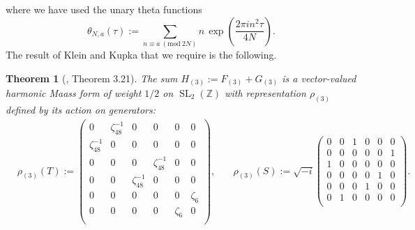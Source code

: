 \documentclass[11pt,reqno]{amsart}
\newtheorem{theorem}{Theorem}[section]
\newcommand{\Z}{\mathbb{Z}}
\renewcommand{\=}{\;=\;}
\renewcommand{\mod}[1]{\ (\mathrm{mod}\ #1)}
\theoremstyle{myremark}
\begin{document}
where we have used the unary theta functions
\begin{equation} \label{eqn:unary_theta_def}
\theta_{N,a}(\tau):=\sum_{n \equiv a \mod {2N}}n\, \exp\left(\frac{2\pi i n^2\tau}{4N}\right).
\end{equation}
The result of Klein and Kupka that we require is the following.
\begin{theorem}[\cite{KK}, Theorem 3.21]\label{thm:KK}
The sum $H_{(3)}:=F_{(3)}+G_{(3)}$ is a vector-valued harmonic Maass form of weight $1/2$ on $\operatorname{SL}_2(\Z)$ with representation $\rho_{(3)}$ defined by its action on generators:
\begin{align*}
&
\rho_{(3)}(T):=
\begin{pmatrix}
0 & \zeta^{-1}_{48} & 0 & 0 & 0 & 0 \\
\zeta^{-1}_{48} & 0 & 0 & 0 & 0 & 0 \\
0 & 0 & 0 & \zeta^{-1}_{48} & 0 & 0 \\
0 & 0 & \zeta^{-1}_{48} & 0 & 0 & 0 \\
0 & 0 & 0 & 0 & 0 & \zeta_6 \\
0 & 0 & 0 & 0 & \zeta_6 & 0 \\
\end{pmatrix},
&\quad
\rho_{(3)}(S):= \sqrt{-i}
\begin{pmatrix}
0 & 0 & 1 & 0 & 0 & 0 \\
0 & 0 & 0 & 0 & 0 & 1 \\
1 & 0 & 0 & 0 & 0 & 0 \\
0 & 0 & 0 & 0 & 1 & 0 \\
0 & 0 & 0 & 1 & 0 & 0 \\
0 & 1 & 0 & 0 & 0 & 0 \\
\end{pmatrix}.
\end{align*}
\end{theorem}
\end{document}
